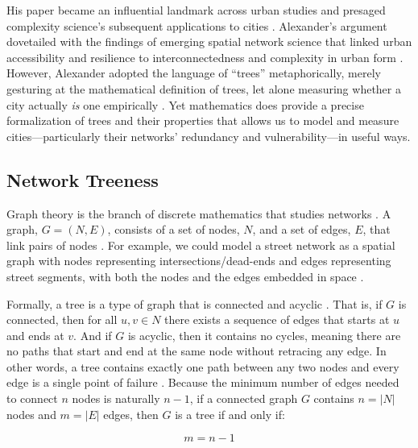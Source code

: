 \documentclass[12pt,letterpaper]{article} %
\begin{document}
His paper became an influential landmark across urban studies and presaged complexity science's subsequent applications to cities \citep{rauber_alexanders_2018,huang_city_2022}. Alexander's argument dovetailed with the findings of emerging spatial network science that linked urban accessibility and resilience to interconnectedness and complexity in urban form \citep{jiang_complex-network_2016,park_network_2015}. However, Alexander adopted the language of \enquote{trees} metaphorically, merely gesturing at the mathematical definition of trees, let alone measuring whether a city actually \textit{is} one empirically \citep{harary_city_1976}. Yet mathematics does provide a precise formalization of trees and their properties that allows us to model and measure cities---particularly their networks' redundancy and vulnerability---in useful ways.

\subsection{Network Treeness}\label{sec:theory_network_treeness}

Graph theory is the branch of discrete mathematics that studies networks \citep{trudeau_introduction_1994}. A graph, $G = (N, E)$, consists of a set of nodes, $N$, and a set of edges, $E$, that link pairs of nodes \citep{barthelemy_spatial_2011}. For example, we could model a street network as a spatial graph with nodes representing intersections/dead-ends and edges representing street segments, with both the nodes and the edges embedded in space \citep{fischer_spatial_2014,porta_2006_network,barthelemy_modeling_2008}.

Formally, a tree is a type of graph that is connected and acyclic \citep{trudeau_introduction_1994}. That is, if $G$ is connected, then for all $u, v \in N$ there exists a sequence of edges that starts at $u$ and ends at $v$. And if $G$ is acyclic, then it contains no cycles, meaning there are no paths that start and end at the same node without retracing any edge. In other words, a tree contains exactly one path between any two nodes and every edge is a single point of failure \citep{newman_networks:_2010}. Because the minimum number of edges needed to connect $n$ nodes is naturally $n - 1$, if a connected graph $G$ contains $n = |N|$ nodes and $m = |E|$ edges, then $G$ is a tree if and only if:

\begin{equation}
  \label{eq:tree_edge_count}
  m = n - 1
\end{equation}
\end{document}
